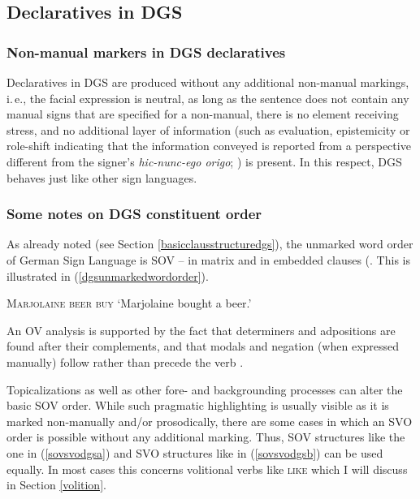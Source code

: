 \subsection{Declaratives in DGS}
\subsubsection{Non-manual markers in DGS declaratives}

Declaratives in DGS are produced without any additional non-manual markings, i.\,e., the facial expression is neutral, as long as the sentence does not contain any manual signs that are specified for a non-manual, there is no element receiving stress, and no additional layer of information (such as evaluation, epistemicity or role-shift indicating that the information conveyed is reported from a perspective different from the signer's \textit{hic-nunc-ego origo}; \citealt{buhler1934}) is present. In this respect, DGS behaves just like other sign languages. 

\subsubsection{Some notes on DGS constituent order}
As already noted (see Section \ref{basicclausstructuredgs}), the unmarked word order of German Sign Language is SOV -- in matrix and in embedded clauses (\citealt{keller1998aspekte, steinbach2013satztypen}. This is illustrated in (\ref{dgsunmarkedwordorder}).

\begin{exe}
\ex \textsc{Marjolaine beer buy}
\glt `Marjolaine bought a beer.'\label{dgsunmarkedwordorder}
\end{exe}

\noindent An OV analysis is supported by the fact that determiners and adpositions are found after their complements, and that modals and negation (when expressed manually) follow rather than precede the verb \citep{pfauquer2007syntaxofnegationandmodals,bross2017scope}.


Topicalizations as well as other fore- and backgrounding processes can alter the basic SOV order. While such pragmatic highlighting is usually visible as it is marked non-manually and/or prosodically, there are some cases in which an SVO order is possible without any additional marking. Thus, SOV structures like the one in (\ref{sovsvodgsa}) and SVO structures like in (\ref{sovsvodgsb}) can be used equally. In most cases this concerns volitional verbs like \textsc{like} which I will discuss in Section \ref{volition}.

